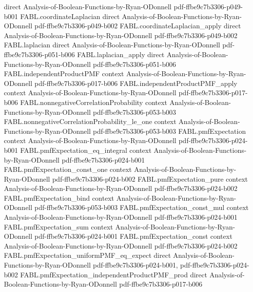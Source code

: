 \begin{theorem}
  {direct}
  {Analysis-of-Boolean-Functions-by-Ryan-ODonnell}
  {pdf-ffbe9c7b3306-p049-b001}
\proofstep
  {FABL.coordinateLaplacian}
  {direct}
  {Analysis-of-Boolean-Functions-by-Ryan-ODonnell}
  {pdf-ffbe9c7b3306-p049-b002}
\proofstep
  {FABL.coordinateLaplacian_apply}
  {direct}
  {Analysis-of-Boolean-Functions-by-Ryan-ODonnell}
  {pdf-ffbe9c7b3306-p049-b002}
\proofstep
  {FABL.laplacian}
  {direct}
  {Analysis-of-Boolean-Functions-by-Ryan-ODonnell}
  {pdf-ffbe9c7b3306-p051-b006}
\proofstep
  {FABL.laplacian_apply}
  {direct}
  {Analysis-of-Boolean-Functions-by-Ryan-ODonnell}
  {pdf-ffbe9c7b3306-p051-b006}
\proofstep
  {FABL.independentProductPMF}
  {context}
  {Analysis-of-Boolean-Functions-by-Ryan-ODonnell}
  {pdf-ffbe9c7b3306-p017-b006}
\proofstep
  {FABL.independentProductPMF_apply}
  {context}
  {Analysis-of-Boolean-Functions-by-Ryan-ODonnell}
  {pdf-ffbe9c7b3306-p017-b006}
\proofstep
  {FABL.nonnegativeCorrelationProbability}
  {context}
  {Analysis-of-Boolean-Functions-by-Ryan-ODonnell}
  {pdf-ffbe9c7b3306-p053-b003}
\proofstep
  {FABL.nonnegativeCorrelationProbability_le_one}
  {context}
  {Analysis-of-Boolean-Functions-by-Ryan-ODonnell}
  {pdf-ffbe9c7b3306-p053-b003}
\proofstep
  {FABL.pmfExpectation}
  {context}
  {Analysis-of-Boolean-Functions-by-Ryan-ODonnell}
  {pdf-ffbe9c7b3306-p024-b001}
\proofstep
  {FABL.pmfExpectation_eq_integral}
  {context}
  {Analysis-of-Boolean-Functions-by-Ryan-ODonnell}
  {pdf-ffbe9c7b3306-p024-b001}
\proofstep
  {FABL.pmfExpectation_const_one}
  {context}
  {Analysis-of-Boolean-Functions-by-Ryan-ODonnell}
  {pdf-ffbe9c7b3306-p024-b002}
\proofstep
  {FABL.pmfExpectation_pure}
  {context}
  {Analysis-of-Boolean-Functions-by-Ryan-ODonnell}
  {pdf-ffbe9c7b3306-p024-b002}
\proofstep
  {FABL.pmfExpectation_bind}
  {context}
  {Analysis-of-Boolean-Functions-by-Ryan-ODonnell}
  {pdf-ffbe9c7b3306-p053-b003}
\proofstep
  {FABL.pmfExpectation_const_mul}
  {context}
  {Analysis-of-Boolean-Functions-by-Ryan-ODonnell}
  {pdf-ffbe9c7b3306-p024-b001}
\proofstep
  {FABL.pmfExpectation_sum}
  {context}
  {Analysis-of-Boolean-Functions-by-Ryan-ODonnell}
  {pdf-ffbe9c7b3306-p024-b001}
\proofstep
  {FABL.pmfExpectation_const}
  {context}
  {Analysis-of-Boolean-Functions-by-Ryan-ODonnell}
  {pdf-ffbe9c7b3306-p024-b002}
\proofstep
  {FABL.pmfExpectation_uniformPMF_eq_expect}
  {direct}
  {Analysis-of-Boolean-Functions-by-Ryan-ODonnell}
  {pdf-ffbe9c7b3306-p024-b001,
    pdf-ffbe9c7b3306-p024-b002}
\proofstep
  {FABL.pmfExpectation_independentProductPMF_prod}
  {direct}
  {Analysis-of-Boolean-Functions-by-Ryan-ODonnell}
  {pdf-ffbe9c7b3306-p017-b006}

\end{theorem}
